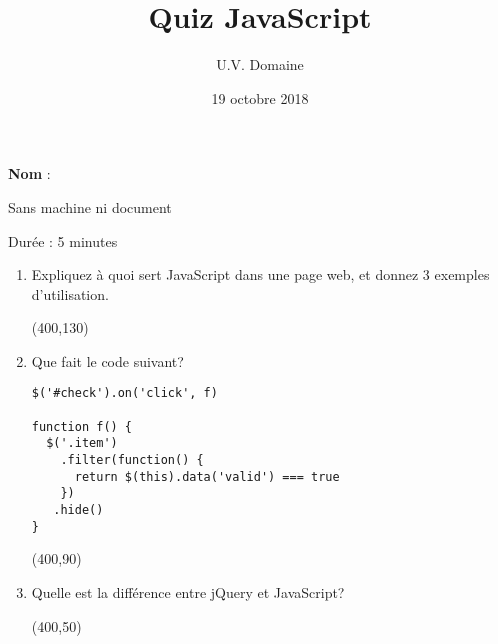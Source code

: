 \documentclass[a4paper, 12pt]{article}
\title{Quiz JavaScript}
\author{U.V. Domaine}
\date{19 octobre 2018}
\begin{document}
\maketitle

\textbf{Nom} :

Sans machine ni document

Durée : 5 minutes

\vspace{1cm}

\begin{enumerate}
\item Expliquez à quoi sert JavaScript dans une page web, et donnez 3 exemples
  d'utilisation.

  \framebox(400,130){}

\item Que fait le code suivant?
\begin{lstlisting}
$('#check').on('click', f)

function f() {
  $('.item')
    .filter(function() {
      return $(this).data('valid') === true
    })
   .hide()
}
\end{lstlisting}

\framebox(400,90){}

\item Quelle est la différence entre jQuery et JavaScript?

  \framebox(400,50){}

\end{enumerate}
\end{document}
